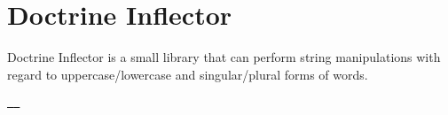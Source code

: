 \chapter{Doctrine Inflector}
\hypertarget{md_vendor_2doctrine_2inflector_2_r_e_a_d_m_e}{}\label{md_vendor_2doctrine_2inflector_2_r_e_a_d_m_e}
\label{md_vendor_2doctrine_2inflector_2_r_e_a_d_m_e_autotoc_md85}%
%
 Doctrine Inflector is a small library that can perform string manipulations with regard to uppercase/lowercase and singular/plural forms of words.

\href{https://github.com/doctrine/inflector/actions?query=workflow\%3A\%22Continuous+Integration\%22+branch\%3A4.0.x}{\texttt{ }} \href{https://codecov.io/gh/doctrine/inflector/branch/2.0.x}{\texttt{ }} 